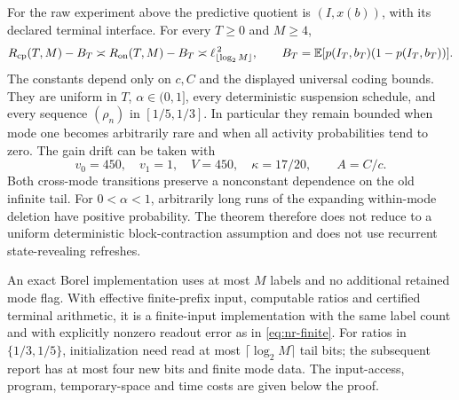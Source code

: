 \begin{theorem}\label{thm:nr-moran}
For the raw experiment above the predictive quotient is $(I,x(b))$, with its declared terminal interface. For every $T\ge0$ and $M\ge4$,
\begin{equation}\label{eq:nr-moran-law}
 R_{\mathrm{cp}}(T,M)-B_T\asymp R_{\mathrm{on}}(T,M)-B_T
          \asymp \ell_{\lfloor\log_2 M\rfloor}^{\,2},
 \qquad B_T=\mathbb E[p(I_T,b_T)(1-p(I_T,b_T))].
\end{equation}
The constants depend only on $c,C$ and the displayed universal coding bounds. They are uniform in $T$, $\alpha\in(0,1]$, every deterministic suspension schedule, and every sequence $(\rho_n)$ in $[1/5,1/3]$. In particular they remain bounded when mode one becomes arbitrarily rare and when all activity probabilities tend to zero. The gain drift can be taken with
\begin{equation}\label{eq:nr-explicit-drift}
 v_0=450,\quad v_1=1,\quad V=450,\quad\kappa=17/20,
 \qquad A=C/c.
\end{equation}
Both cross-mode transitions preserve a nonconstant dependence on the old infinite tail. For $0<\alpha<1$, arbitrarily long runs of the expanding within-mode deletion have positive probability. The theorem therefore does not reduce to a uniform deterministic block-contraction assumption and does not use recurrent state-revealing refreshes.

An exact Borel implementation uses at most $M$ labels and no additional retained mode flag. With effective finite-prefix input, computable ratios and certified terminal arithmetic, it is a finite-input implementation with the same label count and with explicitly nonzero readout error as in \eqref{eq:nr-finite}. For ratios in $\{1/3,1/5\}$, initialization need read at most $\lceil\log_2M\rceil$ tail bits; the subsequent report has at most four new bits and finite mode data. The input-access, program, temporary-space and time costs are given below the proof.
\end{theorem}
